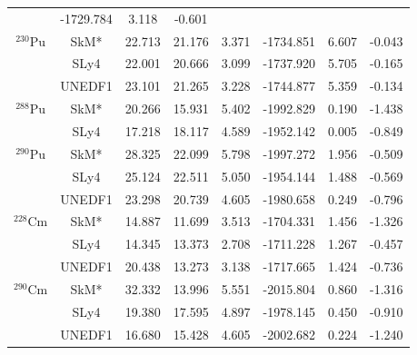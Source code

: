 \documentclass[11pt]{article}
\begin{document}
\begin{table}[htbp]
{\begin{tabular}{cccccccc}
 & -1729.784& 3.118 & -0.601  \\
%
$^{230}\text{Pu}$ & SkM* & 22.713 & 21.176  & 3.371
 & -1734.851 & 6.607
& -0.043  \\
 & SLy4 & 22.001 & 20.666 & 3.099
 & -1737.920& 5.705 & -0.165  \\
 & UNEDF1 & 23.101 & 21.265 & 3.228
 & -1744.877& 5.359 & -0.134  \\
%
$^{288}\text{Pu}$ & SkM* & 20.266 & 15.931  & 5.402
 & -1992.829 & 0.190
& -1.438  \\
 & SLy4 & 17.218 & 18.117 & 4.589
 & -1952.142& 0.005 & -0.849  \\
%
$^{290}\text{Pu}$ & SkM* & 28.325 & 22.099  & 5.798
 & -1997.272 & 1.956
& -0.509  \\
 & SLy4 & 25.124 & 22.511 & 5.050
 & -1954.144& 1.488 & -0.569  \\
 & UNEDF1 & 23.298 & 20.739 & 4.605
 & -1980.658& 0.249 & -0.796  \\
[5pt]
$^{228}\text{Cm}$ & SkM* & 14.887 & 11.699  & 3.513
 & -1704.331 & 1.456
& -1.326  \\
 & SLy4 & 14.345 & 13.373 & 2.708
 & -1711.228& 1.267 & -0.457  \\
 & UNEDF1 & 20.438 & 13.273 & 3.138
 & -1717.665& 1.424 & -0.736  \\
%
$^{290}\text{Cm}$ & SkM* & 32.332 & 13.996  & 5.551
 & -2015.804 & 0.860
& -1.316  \\
 & SLy4 & 19.380 & 17.595 & 4.897
 & -1978.145& 0.450 & -0.910  \\
 & UNEDF1 & 16.680 & 15.428 & 4.605
 & -2002.682& 0.224 & -1.240  \\
\end{tabular}
}
\end{table}
\end{document}
